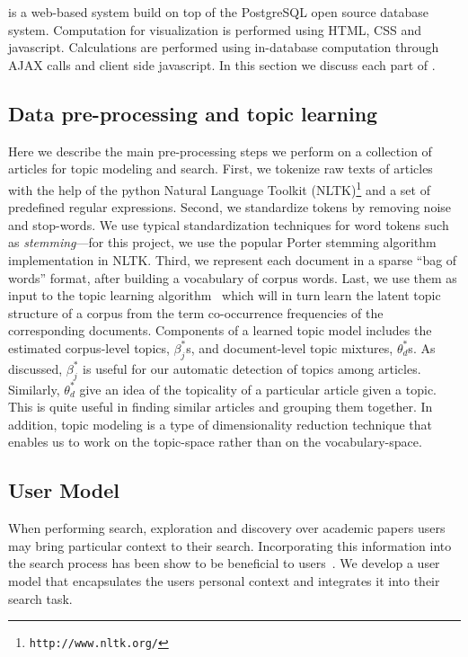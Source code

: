 \section{\system}



\system is a web-based system build on top of the PostgreSQL open 
source database system. Computation for visualization is performed
using HTML, CSS and javascript. Calculations are performed using 
in-database computation through AJAX calls and client side 
javascript. In this section we discuss each part of \system. 

\subsection{Data pre-processing and topic learning}

Here we describe the main pre-processing steps we perform on a 
collection of articles for topic modeling and search. First, 
we tokenize raw texts of articles with the help of the python 
Natural Language Toolkit 
(NLTK)\footnote{\texttt{http://www.nltk.org/}} and a set of 
predefined regular expressions. Second, we standardize tokens by 
removing noise and stop-words. We use typical standardization 
techniques for word tokens such as \textsl{stemming}---for this 
project, we use the popular Porter stemming algorithm~\cite{Porter1980} 
implementation in NLTK. Third, we represent each 
document in a sparse ``bag of words'' format, after building a 
vocabulary of corpus words. Last, we use them as input to the topic 
learning algorithm~\cite{hoffman2010online} which will in turn learn 
the latent topic structure of a corpus from the term co-occurrence 
frequencies of the corresponding documents. Components of a learned 
topic model includes the estimated corpus-level topics, $\beta_j^{*}$s, 
and document-level topic mixtures, $\theta_d^{*}$s. As discussed, 
$\beta_j^{*}$ is useful for our automatic detection of topics among  
articles. Similarly, $\theta_d^{*}$ give an idea of the topicality 
of a particular article given a topic. This is quite useful in 
finding similar articles and grouping them together. In addition, 
topic modeling is a type of dimensionality reduction technique that 
enables us to work on the topic-space rather than on the 
vocabulary-space.



\subsection{User Model}
When performing search, exploration and discovery over academic papers users 
may bring particular context to their search. Incorporating this information
into the search process has been show to be beneficial to 
users~\cite{DZSRWJ,MZPGSOL}.
We develop a user model that 
encapsulates the users personal context and integrates it into their
search task. 

